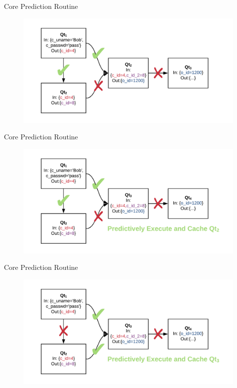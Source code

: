 \documentclass[10pt]{beamer}
\begin{document}
\begin{frame}[fragile]{Core Prediction Routine}
    \begin{figure}
        \hspace*{-1cm}
        \includegraphics[scale=0.22]{apollo_cpr_2}
    \end{figure}
\end{frame}

\begin{frame}[fragile]{Core Prediction Routine}
    \begin{figure}
        \hspace*{-1cm}
        \includegraphics[scale=0.22]{apollo_cpr_3}
    \end{figure}
\end{frame}

\begin{frame}[fragile]{Core Prediction Routine}
    \begin{figure}
        \hspace*{-1cm}
        \includegraphics[scale=0.22]{apollo_cpr_4}
    \end{figure}
\end{frame}
\end{document}
